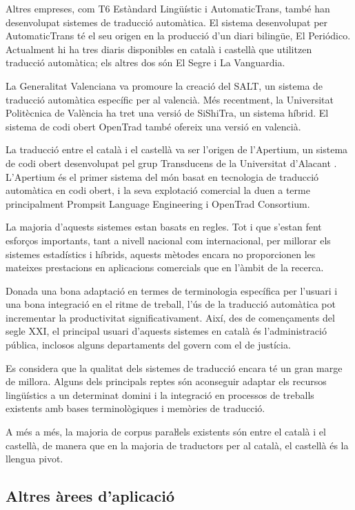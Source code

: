 \documentclass[]{../../metanetpaper}
\begin{document}
\begin{multicols}{2}
Altres empreses, com T6 Estàndard Lingüístic i AutomaticTrans, també han desenvolupat sistemes de traducció automàtica. El sistema desenvolupat per AutomaticTrans té el seu origen en la producció d’un diari bilingüe, El Periódico. Actualment hi ha tres diaris disponibles en català i castellà que utilitzen traducció automàtica; els altres dos són El Segre i La Vanguardia. 

La Generalitat Valenciana va promoure la creació del SALT, un sistema de traducció automàtica específic per al valencià. Més recentment, la Universitat Politècnica de València ha tret una versió de SiShiTra, un sistema híbrid. El sistema de codi obert OpenTrad també ofereix una versió en valencià. 

La traducció entre el català i el castellà va ser l’origen de l’Apertium, un sistema de codi obert desenvolupat pel grup Transducens \cite{CAT-transducens} de la Universitat d’Alacant \cite{CAT-UnivAlacant}. L’Apertium és el primer sistema del món basat en tecnologia de traducció automàtica en codi obert, i la seva explotació comercial la duen a terme principalment Prompsit Language Engineering i OpenTrad Consortium. 

La majoria d’aquests sistemes estan basats en regles. Tot i que s’estan fent esforços importants, tant a nivell nacional com internacional, per millorar els sistemes estadístics i híbrids, aquests mètodes encara no proporcionen les mateixes prestacions en aplicacions comercials que en l’àmbit de la recerca. 

Donada una bona adaptació en termes de terminologia específica per l’usuari i una bona integració en el ritme de treball, l’ús de la traducció automàtica pot incrementar la productivitat significativament. Així, des de començaments del segle XXI, el principal usuari d’aquests sistemes en català és l’administració pública, inclosos alguns departaments del govern com el de justícia.

Es considera que la qualitat dels sistemes de traducció encara té un gran marge de millora. Alguns dels principals reptes són aconseguir adaptar els recursos lingüístics a un determinat domini i la integració en processos de treballs existents amb bases terminològiques i memòries de traducció.

A més a més, la majoria de corpus paraŀlels existents són entre el català i el castellà, de manera que en la majoria de traductors per al català, el castellà és la llengua pivot.

\subsection{Altres àrees d'aplicació}


\end{multicols}
\end{document}
